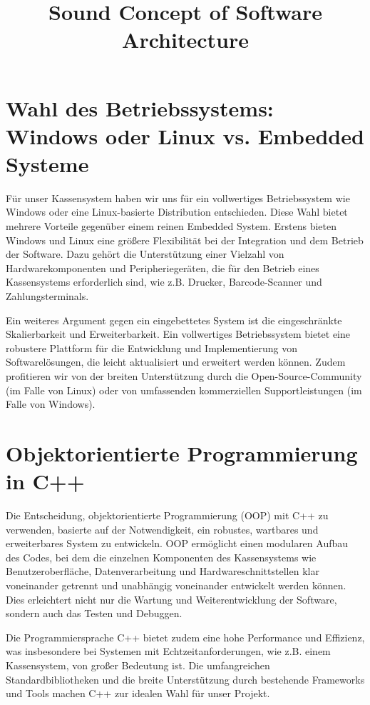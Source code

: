 \documentclass[a4paper,11pt]{article}
\title{Sound Concept of Software Architecture}
\author{}
\date{}
\begin{document}
\maketitle

\section{Wahl des Betriebssystems: Windows oder Linux vs. Embedded Systeme}
Für unser Kassensystem haben wir uns für ein vollwertiges Betriebssystem wie Windows oder eine Linux-basierte Distribution entschieden. Diese Wahl bietet mehrere Vorteile gegenüber einem reinen Embedded System. Erstens bieten Windows und Linux eine größere Flexibilität bei der Integration und dem Betrieb der Software. Dazu gehört die Unterstützung einer Vielzahl von Hardwarekomponenten und Peripheriegeräten, die für den Betrieb eines Kassensystems erforderlich sind, wie z.B. Drucker, Barcode-Scanner und Zahlungsterminals.

Ein weiteres Argument gegen ein eingebettetes System ist die eingeschränkte Skalierbarkeit und Erweiterbarkeit. Ein vollwertiges Betriebssystem bietet eine robustere Plattform für die Entwicklung und Implementierung von Softwarelösungen, die leicht aktualisiert und erweitert werden können. Zudem profitieren wir von der breiten Unterstützung durch die Open-Source-Community (im Falle von Linux) oder von umfassenden kommerziellen Supportleistungen (im Falle von Windows).

\section{Objektorientierte Programmierung in C++}
Die Entscheidung, objektorientierte Programmierung (OOP) mit C++ zu verwenden, basierte auf der Notwendigkeit, ein robustes, wartbares und erweiterbares System zu entwickeln. OOP ermöglicht einen modularen Aufbau des Codes, bei dem die einzelnen Komponenten des Kassensystems wie Benutzeroberfläche, Datenverarbeitung und Hardwareschnittstellen klar voneinander getrennt und unabhängig voneinander entwickelt werden können. Dies erleichtert nicht nur die Wartung und Weiterentwicklung der Software, sondern auch das Testen und Debuggen.

Die Programmiersprache C++ bietet zudem eine hohe Performance und Effizienz, was insbesondere bei Systemen mit Echtzeitanforderungen, wie z.B. einem Kassensystem, von großer Bedeutung ist. Die umfangreichen Standardbibliotheken und die breite Unterstützung durch bestehende Frameworks und Tools machen C++ zur idealen Wahl für unser Projekt.
\end{document}
